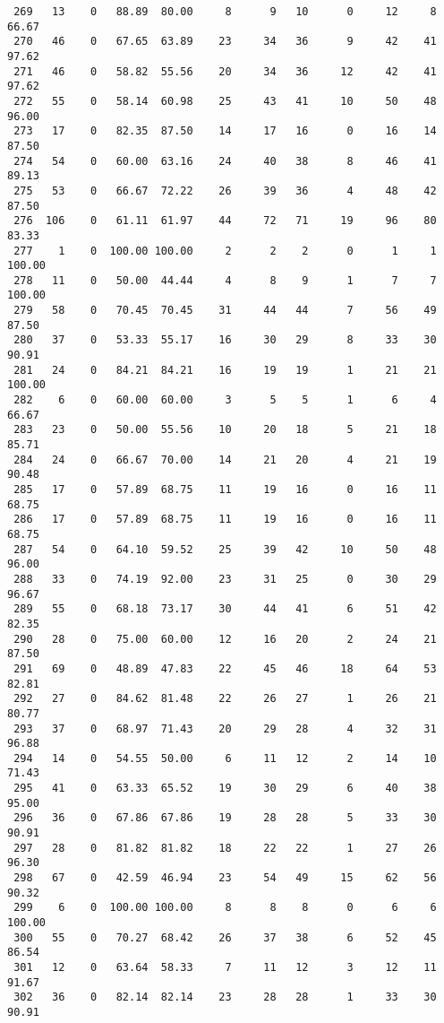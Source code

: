 \begin{verbatim}
 269   13    0   88.89  80.00     8      9   10      0     12     8    66.67
 270   46    0   67.65  63.89    23     34   36      9     42    41    97.62
 271   46    0   58.82  55.56    20     34   36     12     42    41    97.62
 272   55    0   58.14  60.98    25     43   41     10     50    48    96.00
 273   17    0   82.35  87.50    14     17   16      0     16    14    87.50
 274   54    0   60.00  63.16    24     40   38      8     46    41    89.13
 275   53    0   66.67  72.22    26     39   36      4     48    42    87.50
 276  106    0   61.11  61.97    44     72   71     19     96    80    83.33
 277    1    0  100.00 100.00     2      2    2      0      1     1   100.00
 278   11    0   50.00  44.44     4      8    9      1      7     7   100.00
 279   58    0   70.45  70.45    31     44   44      7     56    49    87.50
 280   37    0   53.33  55.17    16     30   29      8     33    30    90.91
 281   24    0   84.21  84.21    16     19   19      1     21    21   100.00
 282    6    0   60.00  60.00     3      5    5      1      6     4    66.67
 283   23    0   50.00  55.56    10     20   18      5     21    18    85.71
 284   24    0   66.67  70.00    14     21   20      4     21    19    90.48
 285   17    0   57.89  68.75    11     19   16      0     16    11    68.75
 286   17    0   57.89  68.75    11     19   16      0     16    11    68.75
 287   54    0   64.10  59.52    25     39   42     10     50    48    96.00
 288   33    0   74.19  92.00    23     31   25      0     30    29    96.67
 289   55    0   68.18  73.17    30     44   41      6     51    42    82.35
 290   28    0   75.00  60.00    12     16   20      2     24    21    87.50
 291   69    0   48.89  47.83    22     45   46     18     64    53    82.81
 292   27    0   84.62  81.48    22     26   27      1     26    21    80.77
 293   37    0   68.97  71.43    20     29   28      4     32    31    96.88
 294   14    0   54.55  50.00     6     11   12      2     14    10    71.43
 295   41    0   63.33  65.52    19     30   29      6     40    38    95.00
 296   36    0   67.86  67.86    19     28   28      5     33    30    90.91
 297   28    0   81.82  81.82    18     22   22      1     27    26    96.30
 298   67    0   42.59  46.94    23     54   49     15     62    56    90.32
 299    6    0  100.00 100.00     8      8    8      0      6     6   100.00
 300   55    0   70.27  68.42    26     37   38      6     52    45    86.54
 301   12    0   63.64  58.33     7     11   12      3     12    11    91.67
 302   36    0   82.14  82.14    23     28   28      1     33    30    90.91

\end{verbatim}
